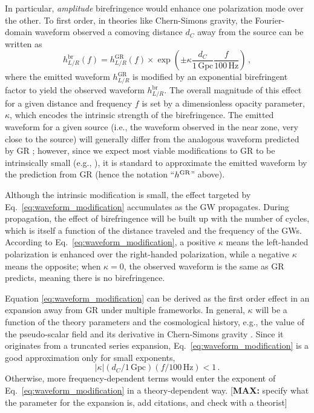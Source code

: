 \documentclass[aps,prd,twocolumn,superscriptaddress,preprintnumbers,floatfix,nofootinbib]{revtex4-2}
\newcommand*{\mi}[1]{\textsf{\color{magenta} [\textbf{MAX:} #1]}}
\begin{document}
In particular, \emph{amplitude} birefringence would enhance one polarization mode over the other.
To first order, in theories like Chern-Simons gravity, the Fourier-domain waveform observed a comoving distance $d_C$ away from the source can be written as
\begin{equation}
    h_{L/R}^{\mathrm{br}}(f) =
    h_{L/R}^{\mathrm{GR}}(f) \times
    \exp\left(\pm\kappa\frac{d_C}{1\, \mathrm{Gpc}}\frac{f}{100\,\mathrm{Hz}}\right)\,,
    \label{eq:waveform_modification}
\end{equation}
where the emitted waveform $h_{L/R}^{\mathrm{GR}}$ is modified by an exponential birefringent factor to yield the observed waveform $h_{L/R}^{\mathrm{br}}$.
The overall magnitude of this effect for a given distance and frequency $f$ is set by a dimensionless opacity parameter, $\kappa$, which encodes the intrinsic strength of the birefringence.
The emitted waveform for a given source (i.e., the waveform observed in the near zone, very close to the source) will generally differ from the analogous waveform predicted by \ac{GR} \cite{Alexander:2009tp,Okounkova:2019zjf}; however, since we expect most viable modifications to \ac{GR} to be intrinsically small (e.g., \cite{Okounkova:2022grv}), it is standard to approximate the emitted waveform by the prediction from \ac{GR} (hence the notation ``$h^{\rm GR}$'' above).

Although the intrinsic modification is small, the effect targeted by Eq.~\eqref{eq:waveform_modification} accumulates as the \ac{GW} propagates.
During propagation, the effect of birefringence will be built up with the number of cycles, which is itself a function of the distance traveled and the frequency of the \acp{GW}.
According to Eq.~\eqref{eq:waveform_modification}, a positive $\kappa$ means the left-handed polarization is enhanced over the right-handed polarization, while a negative $\kappa$ means the opposite;
when $\kappa=0$, the observed waveform is the same as \ac{GR} predicts, meaning there is no birefringence.

Equation \eqref{eq:waveform_modification} can be derived as the first order effect in an expansion away from \ac{GR} under multiple frameworks.
In general, $\kappa$ will be a function of the theory parameters and the cosmological history, e.g., the value of the pseudo-scalar field and its derivative in Chern-Simons gravity \cite{Alexander:2009tp}.
Since it originates from a truncated series expansion, Eq.~\eqref{eq:waveform_modification} is a good approximation only for small exponents, 
\begin{equation}
\left|\kappa\right| \left(d_C/1\,\mathrm{Gpc}\right) \left(f/100\, \mathrm{Hz}\right) < 1\, .
\end{equation}
Otherwise, more frequency-dependent terms would enter the exponent of Eq.~\eqref{eq:waveform_modification} in a theory-dependent way.
\mi{specify what the parameter for the expansion is, add citations, and check with a theorist}
\end{document}

